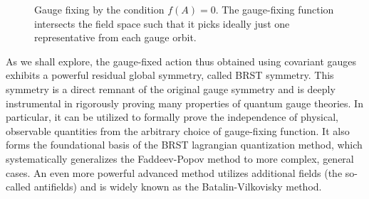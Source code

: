 \begin{figure}[H]
    \begin{minipage}{0.35\textwidth}
        \caption{Gauge fixing by the condition $f(A) = 0$. The gauge-fixing function intersects the field space such that it picks ideally just one representative from each gauge orbit.}
        \label{fig:gauge_fixing}
    \end{minipage}
    \hfill
    \begin{minipage}{0.6\textwidth}
        \centering
    \end{minipage}
\end{figure}

As we shall explore, the gauge-fixed action thus obtained using covariant gauges exhibits a powerful residual global symmetry, called BRST symmetry. This symmetry is a direct remnant of the original gauge symmetry and is deeply instrumental in rigorously proving many properties of quantum gauge theories. In particular, it can be utilized to formally prove the independence of physical, observable quantities from the arbitrary choice of gauge-fixing function. It also forms the foundational basis of the BRST lagrangian quantization method, which systematically generalizes the Faddeev-Popov method to more complex, general cases. An even more powerful advanced method utilizes additional fields (the so-called antifields) and is widely known as the Batalin-Vilkovisky method.

